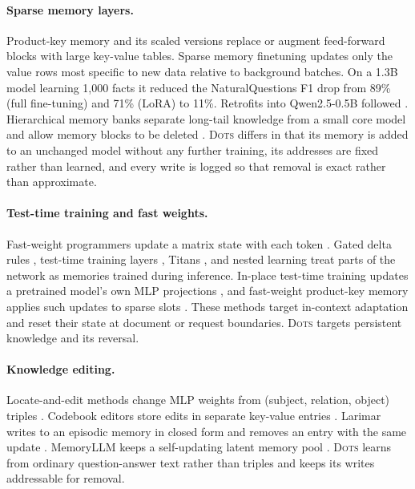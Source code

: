\documentclass[journal]{IEEEtran}
\newcommand{\sys}{\textsc{Dots}}
\let\citep\cite \let\citet\cite
\begin{document}
\paragraph{Sparse memory layers.} Product-key memory \citep{lample2019pkm} and its scaled versions \citep{berges2024memory} replace or augment feed-forward blocks with large key-value tables. Sparse memory finetuning \citep{lin2025smf} updates only the value rows most specific to new data relative to background batches. On a 1.3B model learning 1{,}000 facts it reduced the NaturalQuestions F1 drop from 89\% (full fine-tuning) and 71\% (LoRA) to 11\%. Retrofits into Qwen2.5-0.5B followed \citep{goyal2026improving,gupta2026smf}. Hierarchical memory banks separate long-tail knowledge from a small core model and allow memory blocks to be deleted \citep{pouransari2026hier}. \sys{} differs in that its memory is added to an unchanged model without any further training, its addresses are fixed rather than learned, and every write is logged so that removal is exact rather than approximate.

\paragraph{Test-time training and fast weights.} Fast-weight programmers update a matrix state with each token \citep{schlag2021linear}. Gated delta rules \citep{yang2025gated}, test-time training layers \citep{sun2024ttt}, Titans \citep{behrouz2025titans}, and nested learning \citep{behrouz2025nested} treat parts of the network as memories trained during inference. In-place test-time training updates a pretrained model's own MLP projections \citep{feng2026inplace}, and fast-weight product-key memory applies such updates to sparse slots \citep{zhao2026fwpkm}. These methods target in-context adaptation and reset their state at document or request boundaries. \sys{} targets persistent knowledge and its reversal.

\paragraph{Knowledge editing.} Locate-and-edit methods change MLP weights from (subject, relation, object) triples \citep{meng2022rome,meng2023memit,fang2025alphaedit}. Codebook editors store edits in separate key-value entries \citep{hartvigsen2023grace,wang2024wise}. Larimar writes to an episodic memory in closed form and removes an entry with the same update \citep{das2024larimar}. MemoryLLM keeps a self-updating latent memory pool \citep{wang2024memoryllm}. \sys{} learns from ordinary question-answer text rather than triples and keeps its writes addressable for removal.
\end{document}
